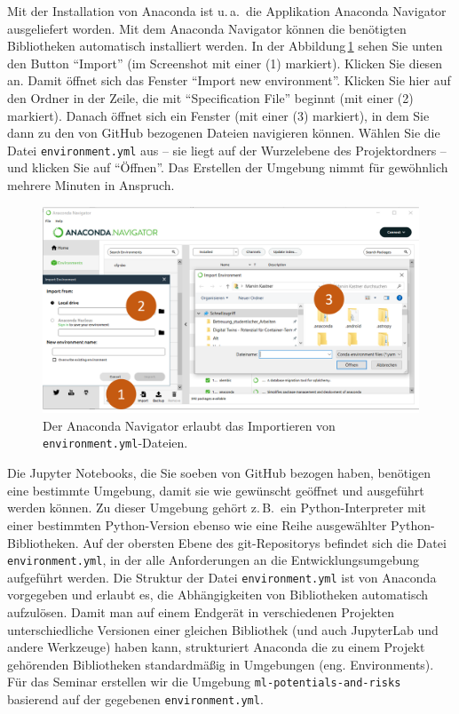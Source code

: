 \documentclass{tufte-handout}
\begin{document}
Mit der Installation von Anaconda ist u.\,a.\ die Applikation Anaconda Navigator ausgeliefert worden.
Mit dem Anaconda Navigator können die benötigten Bibliotheken automatisch installiert werden.
In der Abbildung\,\ref{fig:anaconda-navigator} sehen Sie unten den Button \enquote{Import} (im Screenshot mit einer (1) markiert).
Klicken Sie diesen an.
Damit öffnet sich das Fenster \enquote{Import new environment}.
Klicken Sie hier auf den Ordner in der Zeile, die mit 
\enquote{Specification File}
beginnt (mit einer (2) markiert).
Danach öffnet sich ein Fenster (mit einer (3) markiert), in dem Sie dann zu den von GitHub bezogenen Dateien navigieren können.
Wählen Sie die Datei \texttt{environment.yml} aus
-- sie liegt auf der Wurzelebene des Projektordners --
und klicken Sie auf \enquote{Öffnen}.
Das Erstellen der Umgebung nimmt für gewöhnlich mehrere Minuten in Anspruch.

\begin{figure}[h]
  \includegraphics{anaconda-navigator-import-new-environment--mit-reihenfolge}
  \caption{Der Anaconda Navigator erlaubt das Importieren von \texttt{environment.yml}-Dateien.}%
\label{fig:anaconda-navigator}
\end{figure}

Die Jupyter Notebooks, die Sie soeben von GitHub bezogen haben, benötigen eine bestimmte Umgebung, damit sie wie gewünscht geöffnet und ausgeführt werden können.
Zu dieser Umgebung gehört z.\,B.\ ein Python-Interpreter mit einer bestimmten Python-Version ebenso wie eine Reihe ausgewählter Python-Bibliotheken.
Auf der obersten Ebene des git-Repositorys befindet sich die Datei \texttt{environment.yml}, in der alle Anforderungen an die Entwicklungsumgebung aufgeführt werden.
Die Struktur der Datei \texttt{environment.yml} ist von Anaconda vorgegeben und erlaubt es, die Abhängigkeiten von Bibliotheken automatisch aufzulösen.
Damit man auf einem Endgerät in verschiedenen Projekten unterschiedliche Versionen einer gleichen Bibliothek (und auch JupyterLab und andere Werkzeuge) haben kann,
strukturiert Anaconda die zu einem Projekt gehörenden Bibliotheken standardmäßig in Umgebungen (eng. Environments).
Für das Seminar erstellen wir die Umgebung
\texttt{ml-potentials-and-risks}
basierend auf der gegebenen \texttt{environment.yml}.
\end{document}
